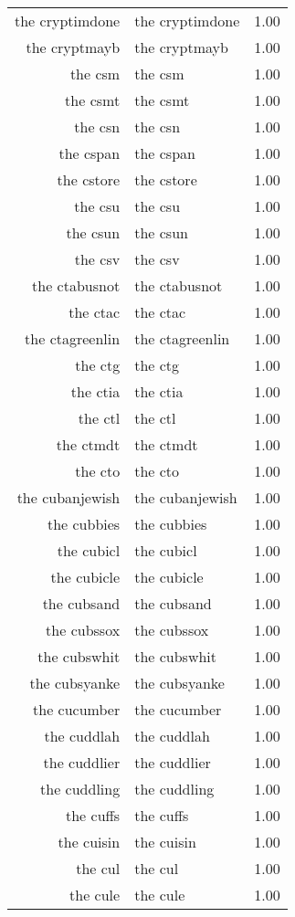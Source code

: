 \begin{table}[ht]
\begin{tabular}{rlr}
  the cryptimdone & the cryptimdone & 1.00 \\ 
  the cryptmayb & the cryptmayb & 1.00 \\ 
  the csm & the csm & 1.00 \\ 
  the csmt & the csmt & 1.00 \\ 
  the csn & the csn & 1.00 \\ 
  the cspan & the cspan & 1.00 \\ 
  the cstore & the cstore & 1.00 \\ 
  the csu & the csu & 1.00 \\ 
  the csun & the csun & 1.00 \\ 
  the csv & the csv & 1.00 \\ 
  the ctabusnot & the ctabusnot & 1.00 \\ 
  the ctac & the ctac & 1.00 \\ 
  the ctagreenlin & the ctagreenlin & 1.00 \\ 
  the ctg & the ctg & 1.00 \\ 
  the ctia & the ctia & 1.00 \\ 
  the ctl & the ctl & 1.00 \\ 
  the ctmdt & the ctmdt & 1.00 \\ 
  the cto & the cto & 1.00 \\ 
  the cubanjewish & the cubanjewish & 1.00 \\ 
  the cubbies & the cubbies & 1.00 \\ 
  the cubicl & the cubicl & 1.00 \\ 
  the cubicle & the cubicle & 1.00 \\ 
  the cubsand & the cubsand & 1.00 \\ 
  the cubssox & the cubssox & 1.00 \\ 
  the cubswhit & the cubswhit & 1.00 \\ 
  the cubsyanke & the cubsyanke & 1.00 \\ 
  the cucumber & the cucumber & 1.00 \\ 
  the cuddlah & the cuddlah & 1.00 \\ 
  the cuddlier & the cuddlier & 1.00 \\ 
  the cuddling & the cuddling & 1.00 \\ 
  the cuffs & the cuffs & 1.00 \\ 
  the cuisin & the cuisin & 1.00 \\ 
  the cul & the cul & 1.00 \\ 
  the cule & the cule & 1.00 \\ 

\end{tabular}
\end{table}
